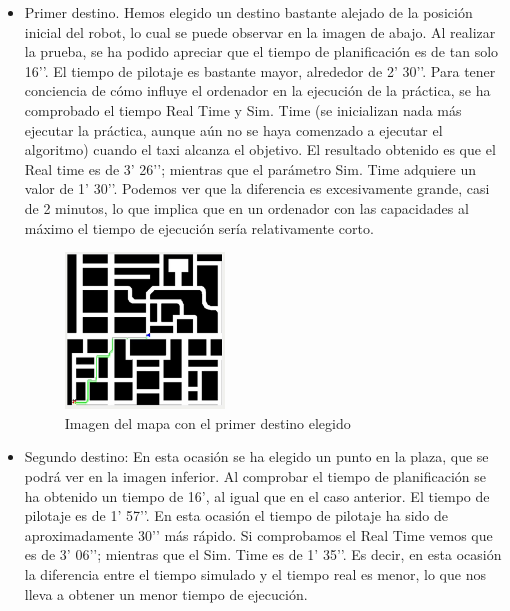 \begin{itemize}
\item Primer destino. Hemos elegido un destino bastante alejado de la posición inicial del robot, lo cual se puede observar en la imagen de abajo. Al realizar la prueba, se ha podido apreciar que el tiempo de planificación es de tan solo 16’’. El tiempo de pilotaje es bastante mayor, alrededor de 2’ 30’’. Para tener conciencia de cómo influye el ordenador en la ejecución de la práctica, se ha comprobado el tiempo Real Time y Sim. Time (se inicializan nada más ejecutar la práctica, aunque aún no se haya comenzado a ejecutar el algoritmo) cuando el taxi alcanza el objetivo. El resultado obtenido es que el Real time es de 3’ 26’’; mientras que el parámetro Sim. Time adquiere un valor de 1’ 30’’. Podemos ver que la diferencia es excesivamente grande, casi de 2 minutos, lo que implica que en un ordenador con las capacidades al máximo el tiempo de ejecución sería relativamente corto.

\begin{figure}[H]
  \begin{center}
    \includegraphics[width=0.4\textwidth]{figures/GPP/Experimento1.png}
		\caption{Imagen del mapa con el primer destino elegido}
		\label{fig.experimento1}
		\end{center}
\end{figure}

\item Segundo destino: En esta ocasión se ha elegido un punto en la plaza, que se podrá ver en la imagen inferior. Al comprobar el tiempo de planificación se ha obtenido un tiempo de 16’, al igual que en el caso anterior. El tiempo de pilotaje es de 1’ 57’’. En esta ocasión el tiempo de pilotaje ha sido de aproximadamente 30’’ más rápido. Si comprobamos el Real Time vemos que es de 3’ 06’’; mientras que el Sim. Time es de 1’ 35’’. Es decir, en esta ocasión la diferencia entre el tiempo simulado y el tiempo real es menor, lo que nos lleva a obtener un menor tiempo de ejecución.


\end{itemize}
